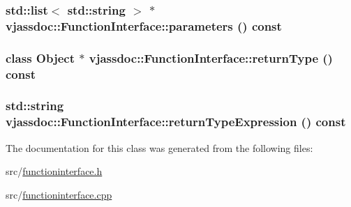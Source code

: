 \hypertarget{classvjassdoc_1_1FunctionInterface_93f6d443529b9f3bb2f9ed679b4dc97a}{
\subsubsection{\setlength{\rightskip}{0pt plus 5cm}std::list$<$ std::string $>$ $\ast$ vjassdoc::FunctionInterface::parameters () const}}
\label{classvjassdoc_1_1FunctionInterface_93f6d443529b9f3bb2f9ed679b4dc97a}


\hypertarget{classvjassdoc_1_1FunctionInterface_5ad6508146fcb9e7c8accf22a0e4d563}{
\subsubsection{\setlength{\rightskip}{0pt plus 5cm}class {\bf Object} $\ast$ vjassdoc::FunctionInterface::returnType () const}}
\label{classvjassdoc_1_1FunctionInterface_5ad6508146fcb9e7c8accf22a0e4d563}


\hypertarget{classvjassdoc_1_1FunctionInterface_951b692881136d487bb89b1dce203f08}{
\subsubsection{\setlength{\rightskip}{0pt plus 5cm}std::string vjassdoc::FunctionInterface::returnTypeExpression () const}}
\label{classvjassdoc_1_1FunctionInterface_951b692881136d487bb89b1dce203f08}




The documentation for this class was generated from the following files:\begin{CompactItemize}
\item 
src/\hyperlink{functioninterface_8h}{functioninterface.h}\item 
src/\hyperlink{functioninterface_8cpp}{functioninterface.cpp}\end{CompactItemize}
